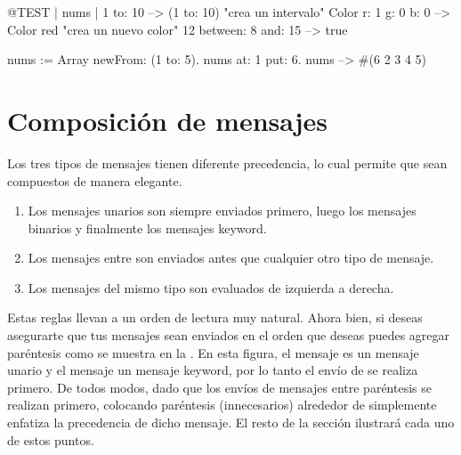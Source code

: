 \documentclass[a4paper,10pt,twoside]{book}
\begin{document}
\begin{code}{@TEST | nums |}
1 to: 10                        --> (1 to: 10)  "crea un intervalo"
Color r: 1 g: 0 b: 0       --> Color red  "crea un nuevo color"
12 between: 8 and: 15 --> true

nums := Array newFrom: (1 to: 5).
nums at: 1 put: 6.
nums --> #(6 2 3 4 5)
\end{code}


\section{Composici\'on de mensajes}
Los tres tipos de mensajes tienen diferente precedencia, lo cual permite que sean compuestos de manera elegante.

\begin{enumerate}
\item Los mensajes unarios son siempre enviados primero, luego los mensajes binarios y finalmente los mensajes keyword.
\item Los mensajes entre  son enviados antes que cualquier otro tipo de mensaje.
\item Los mensajes del mismo tipo son evaluados de izquierda a derecha.
\end{enumerate}

Estas reglas llevan a un orden de lectura muy natural. Ahora bien, si deseas asegurarte que tus mensajes sean enviados en el orden que deseas puedes agregar par\'entesis como se muestra en la . En esta figura, el mensaje  es un mensaje unario y el mensaje  un mensaje keyword, por lo tanto el env\'io de  se realiza primero. De todos modos, dado que los env\'ios de mensajes entre par\'entesis se realizan primero, colocando par\'entesis (innecesarios) alrededor de  simplemente enfatiza la precedencia de dicho mensaje. El resto de la secci\'on ilustrar\'a cada uno de estos puntos.
\end{document}
